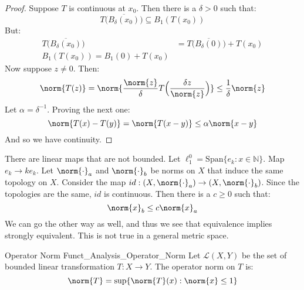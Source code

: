     \begin{proof}
        Suppose $T$ is continuous at $x_{0}$. Then there is a
        $\delta>0$ such that:
        \begin{equation}
            T\Big(\overline{B_{\delta}(x_{0})}\big)
            \subseteq{B}_{1}(T(x_{0}))
        \end{equation}
        But:
        \begin{align}
            T\Big(\overline{B_{\delta}(x_{0})}\big)
            &=T\Big(\overline{B_{\delta}(0)}\big)+T(x_{0})\\
            B_{1}(T(x_{0}))=
            B_{1}(0)+T(x_{0})
        \end{align}
        Now suppose $z\ne{0}$. Then:
        \begin{equation}
            \norm{T(z)}=
            \norm{\frac{\norm{z}}{\delta}
                  T\Big(\frac{\delta{z}}{\norm{z}}\Big)}
            \leq\frac{1}{\delta}\norm{z}
        \end{equation}
        Let $\alpha=\delta^{\minus{1}}$.
        Proving the next one:
        \begin{equation}
            \norm{T(x)-T(y)}=\norm{T(x-y)}
            \leq\alpha\norm{x-y}
        \end{equation}
        And so we have continuity.
    \end{proof}
    There are linear maps that are not bounded. Let
    $\ell_{1}^{0}=\mathrm{Span}\{e_{k}:x\in\mathbb{N}\}$. Map
    $e_{k}\rightarrow{k}e_{k}$. Let
    $\norm{\cdot}_{a}$ and $\norm{\cdot}_{b}$ be norms on
    $X$ that induce the same topology on $X$. Consider the map
    $id:(X,\norm{\cdot}_{a})\rightarrow(X,\norm{\cdot}_{b})$.
    Since the topologies are the same, $id$ is continuous.
    Then there is a $c\geq{0}$ such that:
    \begin{equation}
        \norm{x}_{b}\leq{c}\norm{x}_{a}
    \end{equation}
    We can go the other way as well, and thus we see that
    equivalence implies strongly equivalent. This is not true
    in a general metric space.
    \begin{ldefinition}{Operator Norm}
          {Funct_Analysis_Operator_Norm}
        Let $\mathscr{L}(X,Y)$ be the set of bounded linear
        transformation $T:X\rightarrow{Y}$. The operator
        norm on $T$ is:
        \begin{equation}
            \norm{T}=\sup\{\norm{T}(x):\norm{x}\leq{1}\}
        \end{equation}
    \end{ldefinition}
